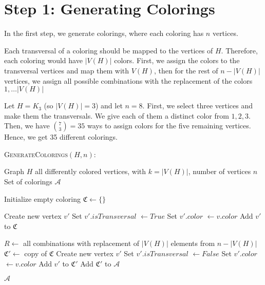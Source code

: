 \section{Step 1: Generating Colorings}
In the first step, we generate colorings, where each coloring has \(n\) vertices.

Each transversal of a coloring should be mapped to the vertices of $H$. Therefore, each coloring would have $|V(H)|$ colors.
First, we assign the colors to the transversal vertices and map them with $V(H)$, then for the rest of $n - |V(H)|$ vertices, we assign all possible combinations with the replacement of the colors  $1, \dots |V(H)|$ 

\begin{example}
 Let \(H = K_3\) (so \( |V(H)| = 3 \)) and let \(n = 8\). 
 First, we select three vertices and make them the transversals. We give each of them a distinct color from $1, 2, 3$.
 Then, we have $\binom{7}{3} = 35$ ways to assign colors for the five remaining vertices. Hence, we get 35 different colorings.
\end{example}


\begin{algorithm}[H]
    \caption{\textsc{GenerateColorings}$(H, n)$:}
    \label{alg:balanced-coloring}
    \begin{algorithmic}[1]
    \Require Graph $H$ all differently colored vertices, with $k = |V(H)|$, number of vertices $n$
    \Ensure Set of colorings $\mathcal{A}$

    \State Initialize empty coloring $\mathfrak{C} \gets \{\}$
    
        \State Create new vertex $v'$
        \State Set $v'.isTransversal$ $\gets True$
        \State Set $v'.color$  $\gets v.color$
        \State Add $v'$ to $\mathfrak{C}$
    \EndFor
    

        \State $R \gets$ all combinations with replacement of $|V(H)|$ elements from $n - |V(H)|$
            \State $\mathfrak{C}' \gets$ copy of $\mathfrak{C}$
                \State Create new vertex $v'$
                \State Set $v'.isTransversal$ $\gets False$
                \State Set $v'.color$  $\gets v.color$
                \State Add $v'$ to $\mathfrak{C}'$
            \EndFor
            \State Add $\mathfrak{C}'$ to $\mathcal{A}$
        \EndFor
    
    \State \Return $\mathcal{A}$
    \end{algorithmic}
\end{algorithm}
    
